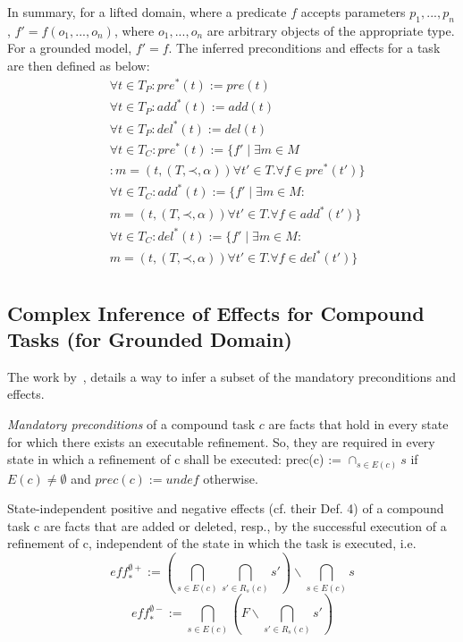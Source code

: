 \documentclass[letterpaper]{article} %
\newcommand{\Pre} {\ensuremath{\mathit{pre}}}  %
\newcommand{\Add} {\ensuremath{\mathit{add}}}
\newcommand{\Del} {\ensuremath{\mathit{del}}}
\newcommand{\PreS} {\ensuremath{\mathit{pre^{*}}}}
\newcommand{\AddS} {\ensuremath{\mathit{add^{*}}}}
\newcommand{\DelS} {\ensuremath{\mathit{del^{*}}}}
\newcommand{\singlePrec} {\ensuremath{\mathit{ \mathord{\prec} }}}
\newcommand{\RelEffPlus} {\ensuremath{\mathit{eff^{\emptyset +}_{*}}}}
\newcommand{\RelEffMinus} {\ensuremath{\mathit{eff^{\emptyset -}_{*}}}}
\begin{document}
In summary, for a lifted domain, where a predicate $f$ accepts parameters $p_1, ..., p_n$, 
$f' = f(o_1, ..., o_n)$, where $o_1, ..., o_n$ are arbitrary objects of the appropriate type. For a grounded model, $f' = f$. The inferred preconditions and effects for a task are then defined as below:
\begin{align*}
& \forall t \in T_P : \PreS(t) := \Pre(t) \\
& \forall t \in T_P : \AddS(t) := \Add(t) \\
& \forall t \in T_P : \DelS(t) := \Del(t)  \\ %
& \forall t \in T_C : \PreS(t) := \{f'  \mid  \exists m \in M  \\
& : m=(t,(T, \singlePrec, \alpha)) \forall t' \in T.  \forall  f \in \PreS(t') \}   \\
& \forall t \in T_C : \AddS(t) := \{f'  \mid  \exists m \in M : \\
& m=(t,(T, \singlePrec, \alpha)) \forall t' \in T.  \forall  f \in \AddS(t') \}   \\
& \forall t \in T_C : \DelS(t) := \{f'  \mid  \exists m \in M : \\
& m=(t,(T, \singlePrec, \alpha)) \forall t' \in T.  \forall  f \in \DelS(t') \}   \\ 
\end{align*}



\subsection{Complex Inference of Effects for Compound Tasks (for Grounded Domain) }
The work by~\cite{ConnyPreEstimation}, details a way to infer a subset of the mandatory preconditions and effects. 

\emph{Mandatory preconditions} of a compound task $c$ are facts that hold in every state for which there exists an executable refinement. So, they are required in every state in which a refinement of c shall be executed: prec(c) := $\cap_{s \in E(c)}  s$
if $E(c) \neq \emptyset$ and $prec(c) := undef$ otherwise.

State-independent positive and negative effects (cf. their
Def. 4) of a compound task c are facts that are added or
deleted, resp., by the successful execution of a refinement of
c, independent of the state in which the task is executed, i.e.
$$ \RelEffPlus := ( \bigcap_{s \in E(c)} \bigcap_{s' \in R_s(c)} s') \backslash  \bigcap_{s \in E(c)} s    $$
$$ \RelEffMinus := \bigcap_{s \in E(c)}  (F \backslash \bigcap_{s' \in R_s(c)} s' ) $$
\end{document}
